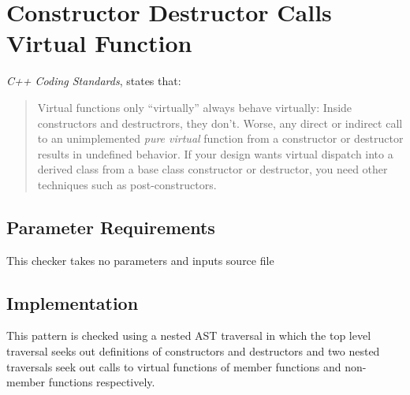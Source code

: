 %
%

\section{Constructor Destructor Calls Virtual Function}
\label{ConstructorDestructorCallsVirtualFunction::overview}

{\it C++ Coding Standards}, states that:
\begin{quote}
Virtual functions only ``virtually'' always behave virtually: Inside constructors and destructrors, they don't. Worse, any direct or indirect call to an unimplemented {\it pure virtual} function from a constructor or destructor results in undefined behavior. If your design wants virtual dispatch into a derived class from a base class constructor or destructor, you need other techniques such as post-constructors.
\end{quote}

\subsection{Parameter Requirements}
This checker takes no parameters and inputs source file

\subsection{Implementation}
This pattern is checked using a nested AST traversal in which the top level
traversal seeks out definitions of constructors and destructors and two
nested traversals seek out calls to virtual functions of member functions
and non-member functions respectively.

